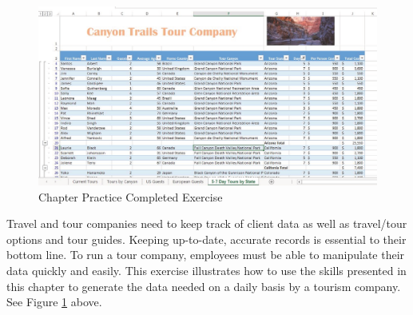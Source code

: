 \begin{figure}[H]
	\centering
	\includegraphics[width=\maxwidth{.95\linewidth}]{gfx/ch05_fig30}
	\caption{Chapter Practice Completed Exercise}
	\label{05:fig30}
\end{figure}

Travel and tour companies need to keep track of client data as well as travel/tour options and tour guides. Keeping up-to-date, accurate records is essential to their bottom line. To run a tour company, employees must be able to manipulate their data quickly and easily. This exercise illustrates how to use the skills presented in this chapter to generate the data needed on a daily basis by a tourism company. See Figure \ref{05:fig30} above.

